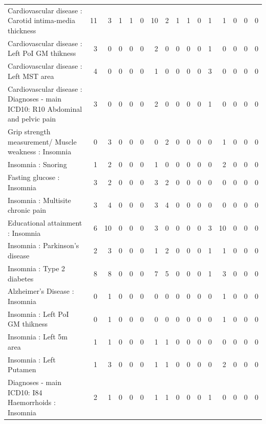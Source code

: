 \begin{table}[ht]
\begin{tabular}{lrrrrrrrrrrrrrrr}
  Cardiovascular disease : Carotid intima-media thickness &  11 &   3 &   1 &   1 &   0 &  10 &   2 &   1 &   1 &   0 &   1 &   1 &   0 &   0 &   0 \\ 
  Cardiovascular disease : Left PoI GM thikness &   3 &   0 &   0 &   0 &   0 &   2 &   0 &   0 &   0 &   0 &   1 &   0 &   0 &   0 &   0 \\ 
  Cardiovascular disease : Left MST area &   4 &   0 &   0 &   0 &   0 &   1 &   0 &   0 &   0 &   0 &   3 &   0 &   0 &   0 &   0 \\ 
  Cardiovascular disease : Diagnoses - main ICD10: R10 Abdominal and pelvic pain &   3 &   0 &   0 &   0 &   0 &   2 &   0 &   0 &   0 &   0 &   1 &   0 &   0 &   0 &   0 \\ 
  Grip strength measurement/ Muscle weakness : Insomnia &   0 &   3 &   0 &   0 &   0 &   0 &   2 &   0 &   0 &   0 &   0 &   1 &   0 &   0 &   0 \\ 
  Insomnia : Snoring &   1 &   2 &   0 &   0 &   0 &   1 &   0 &   0 &   0 &   0 &   0 &   2 &   0 &   0 &   0 \\ 
  Fasting glucose : Insomnia &   3 &   2 &   0 &   0 &   0 &   3 &   2 &   0 &   0 &   0 &   0 &   0 &   0 &   0 &   0 \\ 
  Insomnia : Multisite chronic pain &   3 &   4 &   0 &   0 &   0 &   3 &   4 &   0 &   0 &   0 &   0 &   0 &   0 &   0 &   0 \\ 
  Educational attainment : Insomnia &   6 &  10 &   0 &   0 &   0 &   3 &   0 &   0 &   0 &   0 &   3 &  10 &   0 &   0 &   0 \\ 
  Insomnia : Parkinson's disease &   2 &   3 &   0 &   0 &   0 &   1 &   2 &   0 &   0 &   0 &   1 &   1 &   0 &   0 &   0 \\ 
  Insomnia : Type 2 diabetes &   8 &   8 &   0 &   0 &   0 &   7 &   5 &   0 &   0 &   0 &   1 &   3 &   0 &   0 &   0 \\ 
  Alzheimer's Disease : Insomnia &   0 &   1 &   0 &   0 &   0 &   0 &   0 &   0 &   0 &   0 &   0 &   1 &   0 &   0 &   0 \\ 
  Insomnia : Left PoI GM thikness &   0 &   1 &   0 &   0 &   0 &   0 &   0 &   0 &   0 &   0 &   0 &   1 &   0 &   0 &   0 \\ 
  Insomnia : Left 5m area &   1 &   1 &   0 &   0 &   0 &   1 &   1 &   0 &   0 &   0 &   0 &   0 &   0 &   0 &   0 \\ 
  Insomnia : Left Putamen &   1 &   3 &   0 &   0 &   0 &   1 &   1 &   0 &   0 &   0 &   0 &   2 &   0 &   0 &   0 \\ 
  Diagnoses - main ICD10: I84 Haemorrhoids : Insomnia &   2 &   1 &   0 &   0 &   0 &   1 &   1 &   0 &   0 &   0 &   1 &   0 &   0 &   0 &   0 \\ 

\end{tabular}
\end{table}
